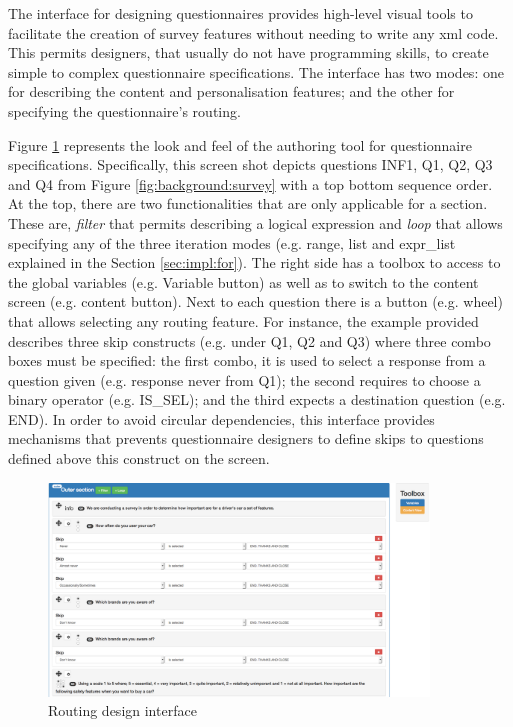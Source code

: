 	The interface for designing questionnaires provides high-level visual tools to facilitate the creation of survey features without needing to write any \gls{xml} code. This permits designers, that usually do not have programming skills, to create simple to complex questionnaire specifications. The interface has two modes: one for describing the content and personalisation features; and the other for specifying the questionnaire's routing.

	Figure \ref{fig:impl:designInterface1} represents the look and feel of the authoring tool for questionnaire specifications. Specifically, this screen shot depicts questions INF1, Q1, Q2, Q3 and Q4 from Figure \ref{fig:background:survey} with a top bottom sequence order. At the top, there are two functionalities that are only applicable for a section. These are, \emph{filter} that permits describing a logical expression and \emph{loop} that allows specifying any of the three iteration modes (e.g. range, list and expr\_list explained in the Section \ref{sec:impl:for}). The right side has a toolbox to access to the global variables (e.g. Variable button) as well as to switch to the content screen (e.g. content button). Next to each question there is a button (e.g. wheel) that allows selecting any routing feature. For instance, the example provided describes three skip constructs (e.g. under Q1, Q2 and Q3) where three combo boxes must be specified: the first combo, it is used to select a response from a question given (e.g. response never from Q1); the second requires to choose a binary operator (e.g. IS\_SEL); and the third expects a destination question (e.g. END). In order to avoid circular dependencies, this interface provides mechanisms that prevents questionnaire designers to define skips to questions defined above this construct on the screen.

	\begin{figure}[h]
	\centering
	\includegraphics[width=0.90\textwidth]{implementation/img/design_1}
	\caption{Routing design interface}
	\label{fig:impl:designInterface1}
	\end{figure}

